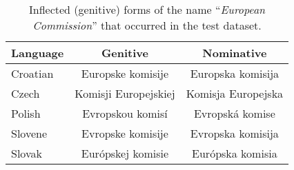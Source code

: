 \documentclass[11pt]{article}
\begin{document}
\begin{table}
  \begin{center}
    \begin{footnotesize}
      \begin{tabular}{lcc}
        \toprule 
        {Language} & {Genitive} & {Nominative}\\
        \midrule
				Croatian & Europske komisije & Europska komisija \\
				Czech & Komisji Europejskiej & Komisja Europejska \\
        Polish & Evropskou komisí & Evropská komise \\
        Slovene & Evropske komisije & Evropska komisija \\
        Slovak & Európskej komisie & Európska komisia \\
        \bottomrule
      \end{tabular}
    \end{footnotesize}
  \end{center}
  \caption{Inflected (genitive) forms of the name ``\textit{European Commission}'' that occurred in the test dataset.} 
  \label{tab:inflected}
\end{table}
\end{document}

